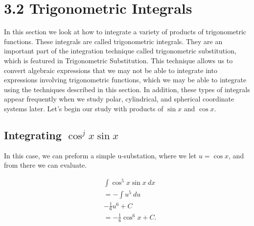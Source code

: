 \documentclass{report}
\begin{document}
        \pagebreak 
        \section*{3.2 Trigonometric Integrals}
        \bigbreak \noindent 
        In this section we look at how to integrate a variety of products of trigonometric functions. These integrals are called trigonometric integrals. They are an important part of the integration technique called trigonometric substitution, which is featured in Trigonometric Substitution. This technique allows us to convert algebraic expressions that we may not be able to integrate into expressions involving trigonometric functions, which we may be able to integrate using the techniques described in this section. In addition, these types of integrals appear frequently when we study polar, cylindrical, and spherical coordinate systems later. Let’s begin our study with products of $\sin{x}$ and $\cos{x}$.

        \bigbreak \noindent 
        \subsection*{Integrating $\cos^{j}{x}\sin{x}$}
        \bigbreak \noindent 
        In this case, we can preform a simple u-substation, where we let $u=\cos{x}$, and from there we can evaluate.
        \bigbreak \noindent 
        \begin{eg}[Evaluate]
           \begin{align*}
               &\int \cos^{5}{x}\sin{x}\ dx \\
               &=- \int u^{5}\ du \\
               &-\frac{1}{6}u^{6} + C \\
               &= -\frac{1}{6}\cos^{6}{x} + C
           .\end{align*} 
        \end{eg}
        
        \bigbreak \noindent 
\end{document}
